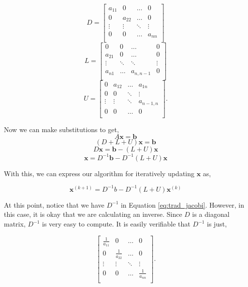 $$
D = \begin{bmatrix}
a_{11} & 0 & \ldots & 0 \\
0 & a_{22} & \ldots & 0 \\
 \vdots & \vdots & \ddots & \vdots \\
0 & 0 & \ldots & a_{nn} \\
\end{bmatrix}
$$
$$
L = \begin{bmatrix}
0 & 0 & \ldots & 0 \\
a_{21} &  0 & \ldots & 0\\
 \vdots & \ddots & \ddots & \vdots \\
a_{n1} & \ldots & a_{n,n-1} & 0 \\
\end{bmatrix}
$$
$$
U = \begin{bmatrix}
0 & a_{12} & \ldots & a_{1n} \\
0 & 0 & \ddots & \vdots \\
 \vdots & \vdots & \ddots & a_{n-1,n} \\
0 & 0 & \ldots & 0 \\
\end{bmatrix}.
$$

Now we can make substitutions to get,
$$ A\mathbf{x} = \mathbf{b} $$
$$ (D + L + U)\mathbf{x} = \mathbf{b} $$
$$ D\mathbf{x} = \mathbf{b} - (L+U)\mathbf{x} $$
$$ \mathbf{x} = D^{-1}\mathbf{b} - D^{-1}(L+U)\mathbf{x} $$

With this, we can express our algorithm for iteratively updating $\mathbf{x}$ as,

\begin{equation} \label{eq:trad_jacobi}
\mathbf{x}^{(k+1)} = D^{-1}b - D^{-1}(L+U)\mathbf{x}^{(k)}
\end{equation}

At this point, notice that we have $D^{-1}$ in Equation \ref{eq:trad_jacobi}. However, in
this case, it is okay that we are calculating an inverse. Since $D$ is a diagonal
matrix, $D^{-1}$ is very easy to compute. It is easily verifiable that $D^{-1}$
is just,

$$
\begin{bmatrix}
\frac{1}{a_{11}} & 0 & \ldots & 0 \\
0 & \frac{1}{a_{22}} & \ldots & 0 \\
 \vdots & \vdots & \ddots & \vdots \\
0 & 0 & \ldots & \frac{1}{a_{nn}} \\
\end{bmatrix}.
$$

